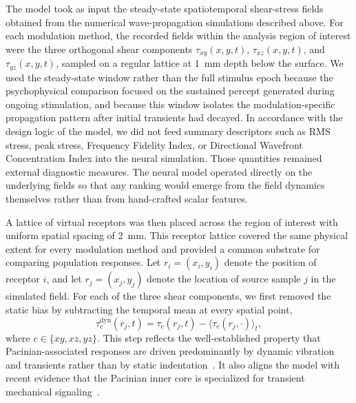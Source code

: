 \documentclass[pdflatex, sn-nature]{sn-jnl}
\theoremstyle{thmstyleone}%
\theoremstyle{thmstyletwo}%
\theoremstyle{thmstylethree}%
\begin{document}
The model took as input the steady-state spatiotemporal shear-stress fields obtained from the numerical wave-propagation simulations described above. For each modulation method, the recorded fields within the analysis region of interest were the three orthogonal shear components $\tau_{xy}(x,y,t)$, $\tau_{xz}(x,y,t)$, and $\tau_{yz}(x,y,t)$, sampled on a regular lattice at \qty{1}{\milli\meter} depth below the surface. We used the steady-state window rather than the full stimulus epoch because the psychophysical comparison focused on the sustained percept generated during ongoing stimulation, and because this window isolates the modulation-specific propagation pattern after initial transients had decayed. In accordance with the design logic of the model, we did not feed summary descriptors such as RMS stress, peak stress, Frequency Fidelity Index, or Directional Wavefront Concentration Index into the neural simulation. Those quantities remained external diagnostic measures. The neural model operated directly on the underlying fields so that any ranking would emerge from the field dynamics themselves rather than from hand-crafted scalar features.

A lattice of virtual receptors was then placed across the region of interest with uniform spatial spacing of \qty{2}{\milli\meter}. This receptor lattice covered the same physical extent for every modulation method and provided a common substrate for comparing population responses. Let $r_i=(x_i,y_i)$ denote the position of receptor $i$, and let $r_j=(x_j,y_j)$ denote the location of source sample $j$ in the simulated field. For each of the three shear components, we first removed the static bias by subtracting the temporal mean at every spatial point,
\begin{equation}
    \tau^{\mathrm{dyn}}_{c}(r_j,t)=\tau_{c}(r_j,t)-\langle \tau_{c}(r_j,\cdot)\rangle_t,
\end{equation}
where $c \in \{xy,xz,yz\}$. This step reflects the well-established property that Pacinian-associated responses are driven predominantly by dynamic vibration and transients rather than by static indentation~\citep{johanssonTactileSensoryCoding1983, johnsonRolesFunctionsCutaneous2001, handlerMechanosensoryNeuronsTouch2021}. It also aligns the model with recent evidence that the Pacinian inner core is specialized for transient mechanical signaling~\citep{ziolkowskiInnerCoreEnables2025}.
\end{document}
